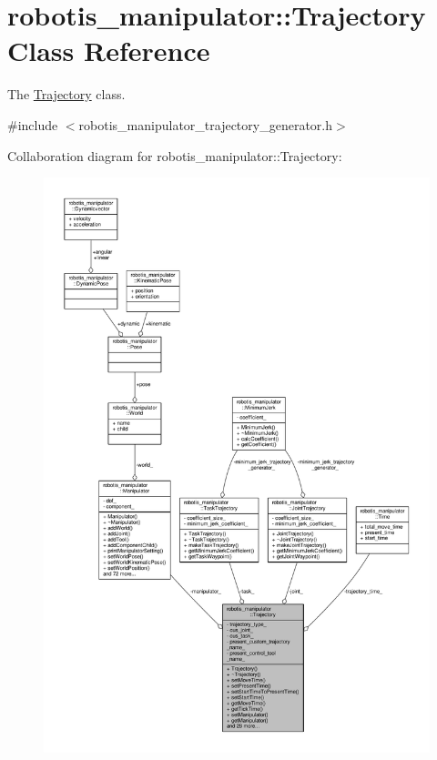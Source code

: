 \hypertarget{classrobotis__manipulator_1_1_trajectory}{}\section{robotis\+\_\+manipulator\+:\+:Trajectory Class Reference}
\label{classrobotis__manipulator_1_1_trajectory}


The \hyperlink{classrobotis__manipulator_1_1_trajectory}{Trajectory} class.  




{\ttfamily \#include $<$robotis\+\_\+manipulator\+\_\+trajectory\+\_\+generator.\+h$>$}



Collaboration diagram for robotis\+\_\+manipulator\+:\+:Trajectory\+:\nopagebreak
\begin{figure}[H]
\begin{center}
\leavevmode
\includegraphics[width=350pt]{classrobotis__manipulator_1_1_trajectory__coll__graph}
\end{center}
\end{figure}
